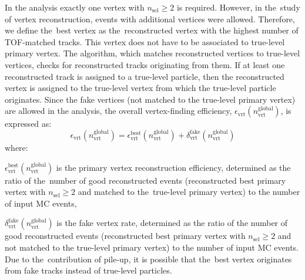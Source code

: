 In the analysis exactly one vertex with $n_\textrm{sel}\geq 2$ is required.  However, in the~study of vertex reconstruction, events with additional vertices were allowed. Therefore, we define the~best vertex as the~reconstructed vertex with the highest number of TOF-matched tracks. This vertex does not have to be associated to true-level primary vertex. The algorithm, which matches reconstructed vertices to true-level vertices,  checks for reconstructed tracks originating from them. If at least one reconstructed track  is assigned to a true-level particle, then the reconstructed vertex is assigned to the true-level vertex from which the true-level particle originates. Since the fake vertices (not matched to the true-level primary vertex) are allowed in the analysis, the overall vertex-finding efficiency, $\epsilon_\textrm{vrt}\left(n_\textrm{vrt}^\textrm{global}\right)$, is expressed as:
\begin{equation}
\epsilon_\textrm{vrt}\left(n_\textrm{vrt}^\textrm{global}\right)=\epsilon_\textrm{vrt}^\textrm{best}\left(n_\textrm{vrt}^\textrm{global}\right)+\delta_\textrm{vrt}^\textrm{fake}\left(n_\textrm{vrt}^\textrm{global}\right)
\end{equation}
where:
\begin{description}
	\item $\epsilon_\textrm{vrt}^\textrm{best}\left(n_\textrm{vrt}^\textrm{global}\right)$ is the primary vertex reconstruction efficiency, determined as the ratio of the~number of good reconstructed events (reconstructed best primary vertex with $n_\textrm{sel}\geq 2$ and matched to the~true-level primary vertex) to the number of input MC events,
	\item $\delta_\textrm{vrt}^\textrm{fake}\left(n_\textrm{vrt}^\textrm{global}\right)$ is the fake vertex rate, determined as the ratio of the number of good reconstructed events (reconstructed best primary vertex with $n_\textrm{sel}\geq 2$ and not matched to the true-level primary vertex) to the number of input MC events. Due to the~contribution of pile-up, it is possible that the~best vertex originates from fake tracks instead of true-level particles.
\end{description}

